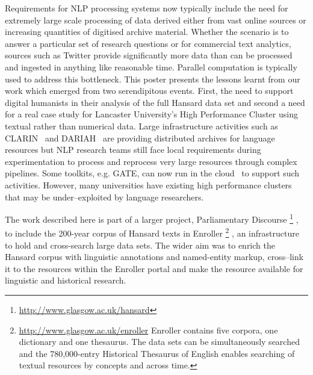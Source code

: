 Requirements for NLP processing systems now typically include the need for extremely large scale processing of data derived either from vast online sources or increasing quantities of digitised archive material. 
Whether the scenario is to answer a particular set of research questions or for commercial text analytics, sources such as Twitter provide significantly more data than can be processed and ingested in anything like reasonable time. Parallel computation is typically used to address this bottleneck. 
This poster presents the lessons learnt from our work which emerged from two serendipitous events. First, the need to support digital humanists in their analysis of the full Hansard data set and second a need for a real case study for Lancaster University's High Performance Cluster using textual rather than numerical data. Large infrastructure activities such as CLARIN~\cite{varadi2008clarin} and DARIAH~\cite{constantopoulos2008preparing} are providing distributed archives for language resources but NLP research teams still face local requirements during experimentation to process and reprocess very large resources through complex pipelines. Some toolkits, e.g. GATE, can now run in the cloud~\cite{tablan2013gatecloud} to support such activities. However, many universities have existing high performance clusters that may be under--exploited by language researchers.  

The work described here is part of a larger project, Parliamentary Discourse%
\footnote{\url{http://www.glasgow.ac.uk/hansard}}%
, to include the 200-year corpus of Hansard texts in Enroller%
\footnote{\url{http://www.glasgow.ac.uk/enroller} Enroller contains five corpora, one dictionary and one thesaurus. The data sets can be simultaneously searched and the 780,000-entry Historical Thesaurus of English enables searching of textual resources by concepts and across time.}%
, an infrastructure to hold and cross-search large data sets. The wider aim was to enrich the Hansard corpus with linguistic annotations and named-entity markup, cross--link it to the resources within the Enroller portal and make the resource available for linguistic and historical research. 

